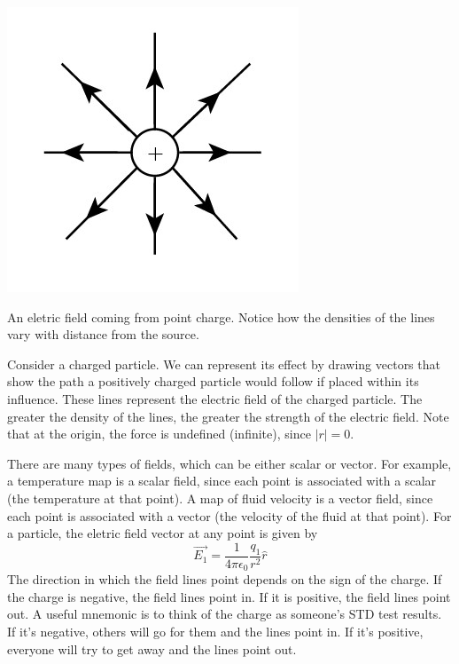 \documentclass[nobib]{tufte-handout}
\begin{document}
\begin{marginfigure}
    \includegraphics{images/electricfieldlines.jpg}
    \caption{An eletric field coming from point charge. 
    Notice how the densities of the lines vary with distance from the source.}
    \label{fig:electric-field-lines-point-charge}
\end{marginfigure}
Consider a charged particle. We can represent its effect
by drawing vectors that show the path a positively charged 
particle would follow if placed within its influence. These lines represent the 
electric field of the charged particle. The greater the density of the lines, the greater 
the strength of the electric field. Note that at the origin, the force is
undefined (infinite), since $|r| = 0$. 

There are many types of fields, which can be either scalar 
or vector. 
For example, a temperature map is a scalar field, since
each point is associated with a scalar (the temperature at that 
point). A map of fluid velocity is a vector field, since each point 
is associated with a vector (the velocity of the fluid at that point).
For a particle, the eletric field vector at any point is given by
\[\vec{E_1} = \frac{1}{4\pi \epsilon_0}\frac{q_1}{r^2}\hat{r}\]
The direction in which the field lines point depends on the 
sign of the charge. If the charge is negative, the field lines point in.
If it is positive, the field lines point out. A useful mnemonic is
to think of the charge as someone's STD test results. If it's negative,
others will go for them and the lines point in. If it's positive, everyone
will try to get away and the lines point out.
\end{document}
